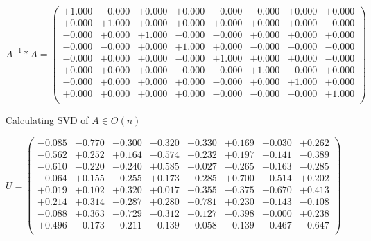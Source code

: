 \documentclass[9pt]{article}
\theoremstyle{plain}
\theoremstyle{definition}
\theoremstyle{remark}
\numberwithin{equation}{section}
\begin{document}
$A^{-1} *A = \left(
\begin{array}{
cccccccc}
+1.000 & -0.000 & +0.000 & +0.000 & -0.000 & -0.000 & +0.000 & +0.000 \\
+0.000 & +1.000 & +0.000 & +0.000 & +0.000 & +0.000 & +0.000 & -0.000 \\
-0.000 & +0.000 & +1.000 & -0.000 & -0.000 & +0.000 & +0.000 & +0.000 \\
-0.000 & -0.000 & +0.000 & +1.000 & +0.000 & -0.000 & -0.000 & -0.000 \\
-0.000 & +0.000 & +0.000 & -0.000 & +1.000 & +0.000 & +0.000 & -0.000 \\
+0.000 & +0.000 & +0.000 & -0.000 & -0.000 & +1.000 & -0.000 & +0.000 \\
-0.000 & +0.000 & +0.000 & +0.000 & -0.000 & +0.000 & +1.000 & +0.000 \\
+0.000 & +0.000 & +0.000 & +0.000 & -0.000 & -0.000 & -0.000 & +1.000 \\
\end{array}
\right)$ \newline 

Calculating SVD of  $A \in O(n)$

$U = \left(
\begin{array}{
cccccccc}
-0.085 & -0.770 & -0.300 & -0.320 & -0.330 & +0.169 & -0.030 & +0.262 \\
-0.562 & +0.252 & +0.164 & -0.574 & -0.232 & +0.197 & -0.141 & -0.389 \\
-0.610 & -0.220 & -0.240 & +0.585 & -0.027 & -0.265 & -0.163 & -0.285 \\
-0.064 & +0.155 & -0.255 & +0.173 & +0.285 & +0.700 & -0.514 & +0.202 \\
+0.019 & +0.102 & +0.320 & +0.017 & -0.355 & -0.375 & -0.670 & +0.413 \\
+0.214 & +0.314 & -0.287 & +0.280 & -0.781 & +0.230 & +0.143 & -0.108 \\
-0.088 & +0.363 & -0.729 & -0.312 & +0.127 & -0.398 & -0.000 & +0.238 \\
+0.496 & -0.173 & -0.211 & -0.139 & +0.058 & -0.139 & -0.467 & -0.647 \\
\end{array}
\right)$ \newline 
\end{document}
